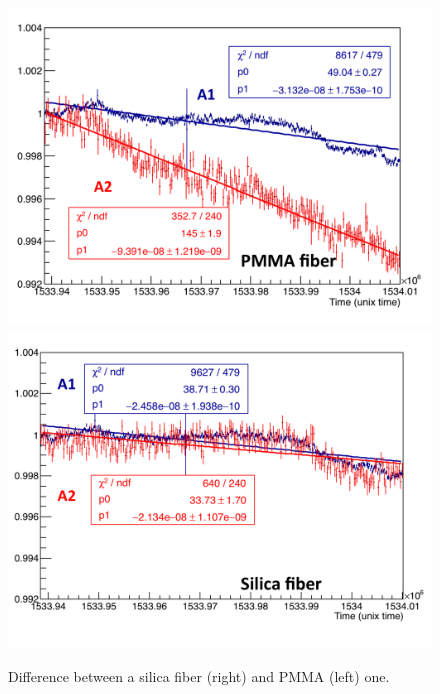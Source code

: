 \documentclass[article,accept,moreauthors,pdftex,10pt,a4paper]{Definitions/mdpi}
\begin{document}
\begin{figure}[H]
\centering
\includegraphics[width=7 cm]{PMMA.pdf}
\includegraphics[width=7 cm]{silica.pdf}
\caption{\label{fig6}Difference between a silica fiber (right) and PMMA (left) one. }
\end{figure}  

\end{document}

